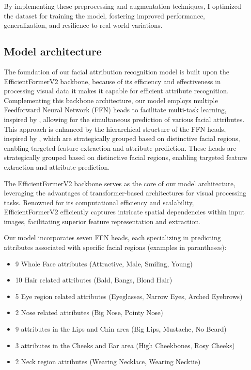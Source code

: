\documentclass[a4paper,oneside]{article}
\begin{document}
By implementing these preprocessing and augmentation techniques, I optimized the dataset for training the model, fostering improved performance, generalization, and resilience to real-world variations.

\subsection{Model architecture}
\label{sec:subsection_model_architecture}

The foundation of our facial attribution recognition model is built upon the EfficientFormerV2 backbone, because of its efficiency and effectiveness in processing visual data it makes it capable for efficient attribute recognition.
Complementing this backbone architecture, our model employs multiple Feedforward Neural Network (FFN) heads to facilitate multi-task learning, inspired by \citet{DBLP:journals/corr/HandC16}, allowing for the simultaneous prediction of various facial attributes.
This approach is enhanced by the hierarchical structure of the FFN heads, inspired by \citet{DBLP:journals/corr/HanJSC17}, which are strategically grouped based on distinctive facial regions, enabling targeted feature extraction and attribute prediction.
These heads are strategically grouped based on distinctive facial regions, enabling targeted feature extraction and attribute prediction.

The EfficientFormerV2 backbone serves as the core of our model architecture, leveraging the advantages of transformer-based architectures for visual processing tasks.
Renowned for its computational efficiency and scalability, EfficientFormerV2 efficiently captures intricate spatial dependencies within input images, facilitating superior feature representation and extraction.

Our model incorporates seven FFN heads, each specializing in predicting attributes associated with specific facial regions (examples in parantheses):

\begin{itemize}
  \item 9 Whole Face attributes (Attractive, Male, Smiling, Young)
  \item 10 Hair related attributes (Bald, Bangs, Blond Hair)
  \item 5 Eye region related attributes (Eyeglasses, Narrow Eyes, Arched Eyebrows)
  \item 2 Nose related attributes (Big Nose, Pointy Nose)
  \item 9 attributes in the Lips and Chin area (Big Lips, Mustache, No Beard)
  \item 3 attributes in the Cheeks and Ear area (High Cheekbones, Rosy Cheeks)
  \item 2 Neck region attributes (Wearing Necklace, Wearing Necktie)
\end{itemize}
\end{document}
